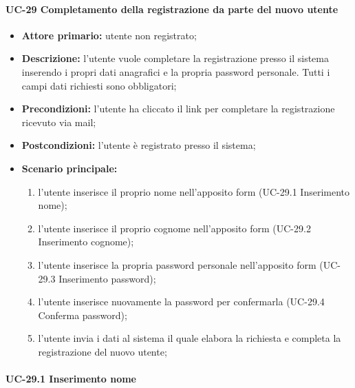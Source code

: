 
\paragraph{UC-29 Completamento della registrazione da parte del nuovo utente}

	\begin{itemize}
		\item \textbf{Attore primario:} utente non registrato;

		\item \textbf{Descrizione:} l'utente vuole completare la registrazione presso il sistema inserendo i propri dati anagrafici e la propria password personale. Tutti i campi dati richiesti sono obbligatori;

		\item \textbf{Precondizioni:} l'utente ha cliccato il link per completare la registrazione ricevuto via mail;

		\item \textbf{Postcondizioni:} l'utente è registrato presso il sistema;

		\item \textbf{Scenario principale:}
	      \begin{enumerate}
		      \item l'utente inserisce il proprio nome nell'apposito form (UC-29.1 Inserimento nome);
		      \item l'utente inserisce il proprio cognome nell'apposito form (UC-29.2 Inserimento cognome);
		      \item l'utente inserisce la propria password personale nell'apposito form (UC-29.3 Inserimento password);
		      \item l'utente inserisce nuovamente la password per confermarla (UC-29.4 Conferma password);
		      \item l'utente invia i dati al sistema il quale elabora la richiesta e completa la registrazione del nuovo utente;
	      \end{enumerate}
	\end{itemize}


\paragraph{UC-29.1 Inserimento nome}


